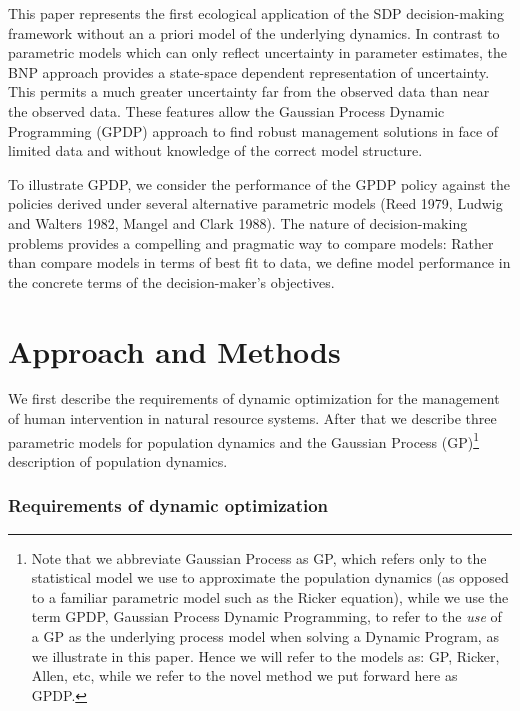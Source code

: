 \documentclass[author-year, 12pt,review]{components/elsarticle} %
\begin{document}
This paper represents the first ecological application of the SDP
decision-making framework without an a priori model of the underlying
dynamics. In contrast to parametric models which can only reflect
uncertainty in parameter estimates, the BNP approach provides a
state-space dependent representation of uncertainty. This permits a much
greater uncertainty far from the observed data than near the observed
data. These features allow the Gaussian Process Dynamic Programming
(GPDP) approach to find robust management solutions in face of limited
data and without knowledge of the correct model structure.

To illustrate GPDP, we consider the performance of the GPDP policy
against the policies derived under several alternative parametric models
(Reed 1979, Ludwig and Walters 1982, Mangel and Clark 1988). The nature
of decision-making problems provides a compelling and pragmatic way to
compare models: Rather than compare models in terms of best fit to data,
we define model performance in the concrete terms of the
decision-maker's objectives.

\section{Approach and Methods}\label{approach-and-methods}

We first describe the requirements of dynamic optimization for the
management of human intervention in natural resource systems. After that
we describe three parametric models for population dynamics and the
Gaussian Process (GP)\footnote{Note that we abbreviate Gaussian Process
  as GP, which refers only to the statistical model we use to
  approximate the population dynamics (as opposed to a familiar
  parametric model such as the Ricker equation), while we use the term
  GPDP, Gaussian Process Dynamic Programming, to refer to the \emph{use}
  of a GP as the underlying process model when solving a Dynamic
  Program, as we illustrate in this paper. Hence we will refer to the
  models as: GP, Ricker, Allen, etc, while we refer to the novel method
  we put forward here as GPDP.} description of population dynamics.

\subsubsection{Requirements of dynamic
optimization}\label{requirements-of-dynamic-optimization}
\end{document}
